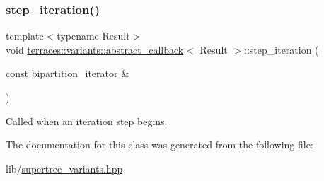 \subsubsection{\texorpdfstring{step\+\_\+iteration()}{step\_iteration()}}
{\footnotesize\ttfamily template$<$typename Result$>$ \\
void \hyperlink{classterraces_1_1variants_1_1abstract__callback}{terraces\+::variants\+::abstract\+\_\+callback}$<$ Result $>$\+::step\+\_\+iteration (\begin{DoxyParamCaption}\item[{const \hyperlink{classterraces_1_1bipartition__iterator}{bipartition\+\_\+iterator} \&}]{ }\end{DoxyParamCaption})\hspace{0.3cm}{\ttfamily [inline]}}

Called when an iteration step begins. 

The documentation for this class was generated from the following file\+:\begin{DoxyCompactItemize}
\item 
lib/\hyperlink{supertree__variants_8hpp}{supertree\+\_\+variants.\+hpp}\end{DoxyCompactItemize}
